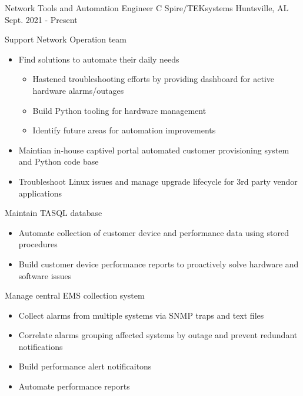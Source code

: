 
\begin{cventries}
  \cventry
    {Network Tools and Automation Engineer} %
    {C Spire/TEKsystems} %
    {Huntsville, AL} %
    {Sept. 2021 - Present} %
    {
      \begin{cvitems} %
        \item {Support Network Operation team}
            \begin{itemize}
                \item {Find solutions to automate their daily needs}
                    \begin{itemize}
                        \item {Hastened troubleshooting efforts by providing dashboard for active hardware alarms/outages}
                        \item {Build Python tooling for hardware management}
                        \item {Identify future areas for automation improvements}
                    \end{itemize}
                \item {Maintian in-house captivel portal automated customer provisioning system and Python code base}
                \item {Troubleshoot Linux issues and manage upgrade lifecycle for 3rd party vendor applications}
            \end{itemize}
        \item {Maintain TASQL database}
            \begin{itemize}
                \item {Automate collection of customer device and performance data using stored procedures}
                \item {Build customer device performance reports to proactively solve hardware and software issues}
            \end{itemize}
        \item {Manage central EMS collection system}
            \begin{itemize}
                \item {Collect alarms from multiple systems via SNMP traps and text files}
                \item {Correlate alarms grouping affected systems by outage and prevent redundant notifications}
                \item {Build performance alert notificaitons}
                \item {Automate performance reports}
            \end{itemize}
      \end{cvitems}
    }


\end{cventries}
